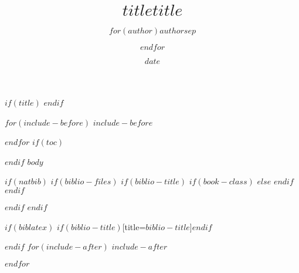 \documentclass[$if(fontsize)$$fontsize$,$endif$$if(handout)$handout,$endif$$if(beamer)$ignorenonframetext,$endif$]{$documentclass$}
\title[$shorttitle$]{$title$}
\title{$title$}
\author{$for(author)$$author$$sep$ \and $endfor$}
\date{$date$}
\institute[统计之都]{
统计之都\\
\hurl{http://cos.name}
}
\begin{document}
$if(title)$
  \frame{\titlepage}
$endif$
 
$for(include-before)$
$include-before$
 
$endfor$
$if(toc)$
\begin{frame}
\tableofcontents[hideallsubsections]
\end{frame}
 
$endif$
$body$
 
$if(natbib)$
  $if(biblio-files)$
    $if(biblio-title)$
      $if(book-class)$
        \renewcommand\bibname{$biblio-title$}
      $else$
        \renewcommand\refname{$biblio-title$}
      $endif$
    $endif$
      
 
  $endif$
$endif$

$if(biblatex)$
  \printbibliography$if(biblio-title)$[title=$biblio-title$]$endif$
 
$endif$
$for(include-after)$
  $include-after$
 
$endfor$
\end{document}
